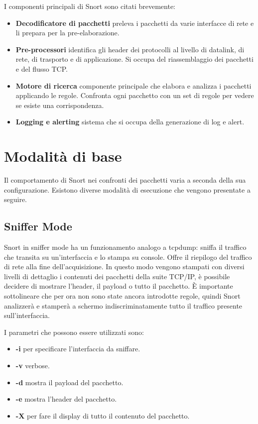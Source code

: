 I componenti principali di Snort sono citati brevemente:
\begin{itemize}
    \item \textbf{Decodificatore di pacchetti}  preleva i pacchetti da varie interfacce di rete e li prepara per la pre-elaborazione.
    \item \textbf{Pre-processori}  identifica gli header dei protocolli al livello di datalink, di rete, di trasporto e di applicazione. Si occupa del riassemblaggio dei pacchetti e del flusso TCP.
    \item \textbf{Motore di ricerca} componente principale che elabora e analizza i pacchetti applicando le regole. Confronta ogni pacchetto con un set di regole per vedere se esiste una corrispondenza.
    \item \textbf{Logging e alerting} sistema che si occupa della generazione di log e alert.
\end{itemize}

\section{Modalità di base}

Il comportamento di Snort nei confronti dei pacchetti varia a seconda della sua configurazione. Esistono diverse modalità di esecuzione che vengono presentate a seguire.

\subsection{Sniffer Mode}

Snort in sniffer mode ha un funzionamento analogo a tcpdump: sniffa il traffico che transita su un'interfaccia e lo stampa su console. Offre il riepilogo del traffico di rete alla fine dell'acquisizione. In questo modo vengono stampati con diversi livelli di dettaglio i contenuti dei pacchetti della suite TCP/IP, è possibile decidere di mostrare l'header, il payload o tutto il pacchetto. È importante sottolineare che per ora non sono state ancora introdotte regole, quindi Snort analizzerà e stamperà a schermo indiscriminatamente tutto il traffico presente sull'interfaccia.

I parametri che possono essere utilizzati sono:

\begin{itemize}
    \item \textbf{-i} per specificare l'interfaccia da sniffare.
    \item \textbf{-v} verbose.
    \item \textbf{-d} mostra il payload del pacchetto.
    \item \textbf{-e} mostra l'header del pacchetto.
    \item \textbf{-X} per fare il display di tutto il contenuto del pacchetto.
\end{itemize}

